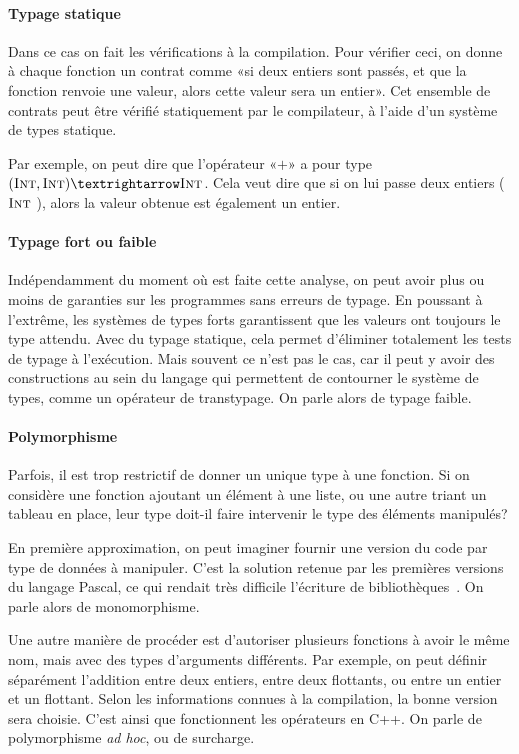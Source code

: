 \paragraph{Typage statique}

Dans ce cas on fait les vérifications à la compilation. Pour vérifier ceci, on
donne à chaque fonction un contrat comme «si deux entiers sont passés, et que
la fonction renvoie une valeur, alors cette valeur sera un entier». Cet
ensemble de contrats peut être vérifié statiquement par le compilateur, à l'aide
d'un système de types statique.

Par exemple, on peut dire que l'opérateur «$+$» a pour type $(\tInt, \tInt) →
\tInt$. Cela veut dire que si on lui passe deux entiers ($\textsc{Int}$ \tInt), alors
la valeur obtenue est également un entier.

\paragraph{Typage fort ou faible}

Indépendamment du moment où est faite cette analyse, on peut avoir plus ou moins
de garanties sur les programmes sans erreurs de typage. En poussant à l'extrême,
les systèmes de types forts garantissent que les valeurs ont toujours le type
attendu. Avec du typage statique, cela permet d'éliminer totalement les tests de
typage à l'exécution. Mais souvent ce n'est pas le cas, car il peut y avoir des
constructions au sein du langage qui permettent de contourner le système de
types, comme un opérateur de transtypage. On parle alors de typage faible.

\paragraph{Polymorphisme}

Parfois, il est trop restrictif de donner un unique type à une fonction. Si on
considère une fonction ajoutant un élément à une liste, ou une autre
triant un tableau en place, leur type doit-il faire intervenir le type des
éléments manipulés?

En première approximation, on peut imaginer fournir une version du code par type
de données à manipuler. C'est la solution retenue par les premières versions du
langage Pascal, ce qui rendait très difficile l'écriture de
bibliothèques~\cite{PascalNoEscape}. On parle alors de monomorphisme.

Une autre manière de procéder est d'autoriser plusieurs fonctions à avoir le
même nom, mais avec des types d'arguments différents. Par exemple, on peut
définir séparément l'addition entre deux entiers, entre deux flottants, ou entre
un entier et un flottant. Selon les informations connues à la compilation, la
bonne version sera choisie. C'est ainsi que fonctionnent les opérateurs en C++.
On parle de polymorphisme \emph{ad hoc}, ou de surcharge.


